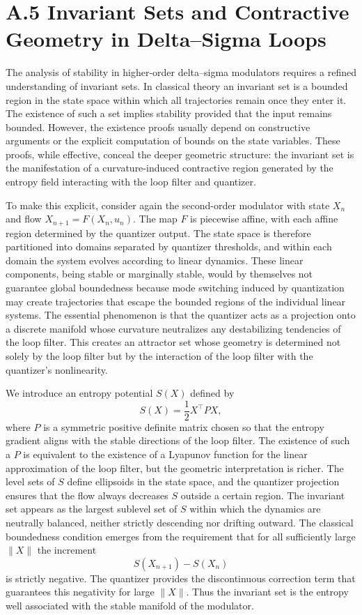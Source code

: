 \section{A.5 Invariant Sets and Contractive Geometry in Delta–Sigma Loops}

The analysis of stability in higher-order delta–sigma modulators requires a refined understanding of invariant sets. In classical theory an invariant set is a bounded region in the state space within which all trajectories remain once they enter it. The existence of such a set implies stability provided that the input remains bounded. However, the existence proofs usually depend on constructive arguments or the explicit computation of bounds on the state variables. These proofs, while effective, conceal the deeper geometric structure: the invariant set is the manifestation of a curvature-induced contractive region generated by the entropy field interacting with the loop filter and quantizer.

To make this explicit, consider again the second-order modulator with state \(X_n\) and flow \(X_{n+1}=F(X_n,u_n)\). The map \(F\) is piecewise affine, with each affine region determined by the quantizer output. The state space is therefore partitioned into domains separated by quantizer thresholds, and within each domain the system evolves according to linear dynamics. These linear components, being stable or marginally stable, would by themselves not guarantee global boundedness because mode switching induced by quantization may create trajectories that escape the bounded regions of the individual linear systems. The essential phenomenon is that the quantizer acts as a projection onto a discrete manifold whose curvature neutralizes any destabilizing tendencies of the loop filter. This creates an attractor set whose geometry is determined not solely by the loop filter but by the interaction of the loop filter with the quantizer's nonlinearity.

We introduce an entropy potential \(S(X)\) defined by
\[
S(X) = \frac{1}{2} X^\top P X,
\]
where \(P\) is a symmetric positive definite matrix chosen so that the entropy gradient aligns with the stable directions of the loop filter. The existence of such a \(P\) is equivalent to the existence of a Lyapunov function for the linear approximation of the loop filter, but the geometric interpretation is richer. The level sets of \(S\) define ellipsoids in the state space, and the quantizer projection ensures that the flow always decreases \(S\) outside a certain region. The invariant set appears as the largest sublevel set of \(S\) within which the dynamics are neutrally balanced, neither strictly descending nor drifting outward. The classical boundedness condition emerges from the requirement that for all sufficiently large \(\|X\|\) the increment
\[
S(X_{n+1}) - S(X_n)
\]
is strictly negative. The quantizer provides the discontinuous correction term that guarantees this negativity for large \(\|X\|\). Thus the invariant set is the entropy well associated with the stable manifold of the modulator.

